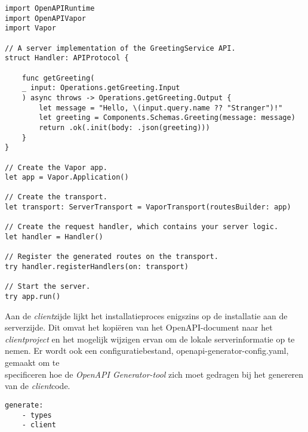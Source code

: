 \begin{lstlisting}[caption=Using generated API Server Stubs]
import OpenAPIRuntime
import OpenAPIVapor
import Vapor

// A server implementation of the GreetingService API.
struct Handler: APIProtocol {
    
    func getGreeting(
    _ input: Operations.getGreeting.Input
    ) async throws -> Operations.getGreeting.Output {
        let message = "Hello, \(input.query.name ?? "Stranger")!"
        let greeting = Components.Schemas.Greeting(message: message)
        return .ok(.init(body: .json(greeting)))
    }
}

// Create the Vapor app.
let app = Vapor.Application()

// Create the transport.
let transport: ServerTransport = VaporTransport(routesBuilder: app)

// Create the request handler, which contains your server logic.
let handler = Handler()

// Register the generated routes on the transport.
try handler.registerHandlers(on: transport)

// Start the server.
try app.run()
\end{lstlisting}

Aan de \textit{client}zijde lijkt het installatieproces enigszins op de installatie aan de serverzijde. Dit omvat het kopiëren van het OpenAPI-document naar het \textit{clientproject} en het mogelijk wijzigen ervan om de lokale serverinformatie op te nemen. Er wordt ook een configuratiebestand, openapi-generator-config.yaml, gemaakt om te \\specificeren hoe de \textit{OpenAPI Generator-tool} zich moet gedragen bij het genereren van de \textit{client}code.

\begin{lstlisting}[caption=openapi-generator-config.yaml client file]
    generate:
    - types
    - client
\end{lstlisting}

